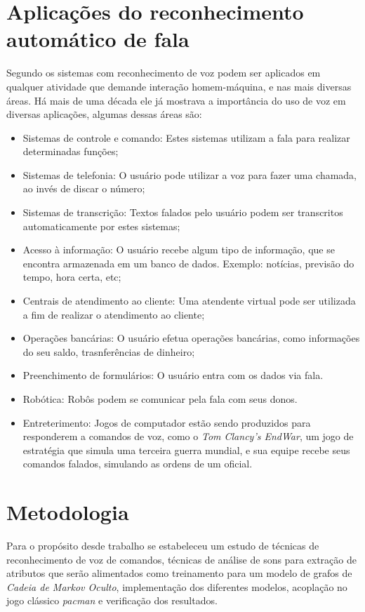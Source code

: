 \section{Aplicações do reconhecimento automático de fala}
Segundo  os sistemas com reconhecimento de voz podem ser aplicados em qualquer atividade que demande interação homem-máquina, e nas mais diversas áreas. Há mais de uma década ele já mostrava a importância do uso de voz em diversas aplicações, algumas dessas áreas são:

\begin{itemize}
\item Sistemas de controle e comando: Estes sistemas utilizam a fala para realizar
determinadas funções;
\item Sistemas de telefonia: O usuário pode utilizar a voz para fazer uma chamada, ao
invés de discar o número;
\item Sistemas de transcrição: Textos falados pelo usuário podem ser transcritos
automaticamente por estes sistemas;
\item Acesso à informação: O usuário recebe algum tipo de informação, que se encontra armazenada em um banco de dados. Exemplo: notícias, previsão do tempo, hora certa, etc;
\item Centrais de atendimento ao cliente: Uma atendente virtual pode ser utilizada a fim
de realizar o atendimento ao cliente;
\item Operações bancárias: O usuário efetua operações bancárias, como informações do seu saldo, trasnferências de dinheiro;
\item Preenchimento de formulários: O usuário entra com os dados via fala.
\item Robótica: Robôs podem se comunicar pela fala com seus donos.
\item Entreterimento: Jogos de computador estão sendo produzidos para responderem a comandos de voz, como o \textit{Tom Clancy's EndWar}, um jogo de estratégia que simula uma terceira guerra mundial, e sua equipe recebe seus comandos falados, simulando as ordens de um oficial.
\end{itemize}

\section{Metodologia}
Para o propósito desde trabalho se estabeleceu um estudo de técnicas de reconhecimento de voz de comandos, técnicas de análise de sons para extração de atributos que serão alimentados como treinamento para um modelo de grafos de \textit{Cadeia de Markov Oculto}, implementação dos diferentes modelos, acoplação no jogo clássico \textit{pacman} e verificação dos resultados.

